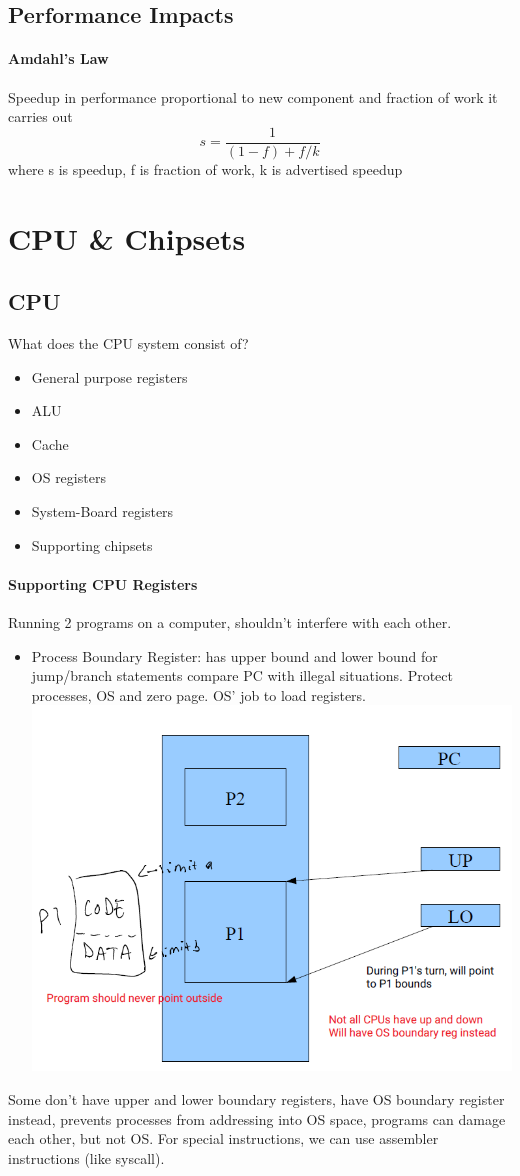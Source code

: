 \documentclass[12 pt]{article}
\begin{document}
\subsection{Performance Impacts}
\paragraph{Amdahl's Law} Speedup in performance proportional to new component and fraction of work it carries out
$$ s= \frac{1}{(1-f)+f/k}$$
where s is speedup, f is fraction of work, k is advertised speedup 
\section{CPU \& Chipsets}
\subsection{CPU}
What does the CPU system consist of?
\begin{itemize}
\item General purpose registers
\item ALU
\item Cache
\item OS registers
\item System-Board registers
\item Supporting chipsets
\end{itemize}
\paragraph{Supporting CPU Registers}
Running 2 programs on a computer, shouldn't interfere with each other.
\begin{itemize}
\item Process Boundary Register: has upper bound and lower bound for jump/branch statements compare PC with illegal situations. Protect processes, OS and zero page. OS' job to load registers.
\\ \includegraphics[scale=0.7]{pbd}
\end{itemize}
Some don't have upper and lower boundary registers, have OS boundary register instead, prevents processes from addressing into OS space, programs can damage each other, but not OS. For special instructions, we can use assembler instructions (like syscall).
\end{document}
